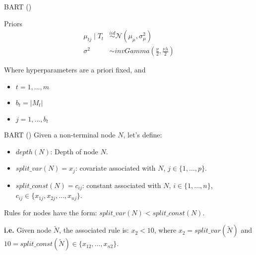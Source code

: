 \documentclass[10pt]{beamer}
\begin{document}
\begin{frame}{BART (\cite{Chipman_2010})}
    \begin{block}{Priors}
        \begin{align}
            \mu_{tj} \mid T_t &\stackrel{iid}{\sim} \mathcal{N}\left(\mu_\mu, \sigma_\mu^2\right) \\
            \sigma^2 &\sim invGamma\left(\frac{\nu}{2}, \frac{\nu\lambda}{2}\right) 
        \end{align}
    \end{block}

    Where hyperparameters are a priori fixed, and
    \begin{itemize}
        \item $t = 1,...,m$
        \item $b_t = |M_t|$
        \item $j = 1,...,b_t$
    \end{itemize}
\end{frame}

\begin{frame}{BART (\cite{Chipman_2010})}
    Given a non-terminal node $N$, let's define:
    \begin{itemize}
        \item $depth(N)$: Depth of node $N$.
        \item $split\_var(N) = x_j$: covariate associated with $N$, $j \in \{1,\dots, p\}$.
        \item $split\_const(N) = c_{ij}$: constant associated with $N$, $i \in \{1,\dots, n\}$, $c_{ij} \in \{x_{1j}, x_{2j}, \dots, x_{nj}\}$.
    \end{itemize}
    Rules for nodes have the form: $split\_var(N) < split\_const(N)$. \bigskip
    
    \textbf{i.e.} Given node $\tilde{N}$, the associated rule is: $x_2 < 10$, where $x_2 = split\_var(\tilde{N})$ and $10 = split\_const(\tilde{N}) \in \{x_{12}, \dots, x_{n2}\}$.
\end{frame}
\end{document}
